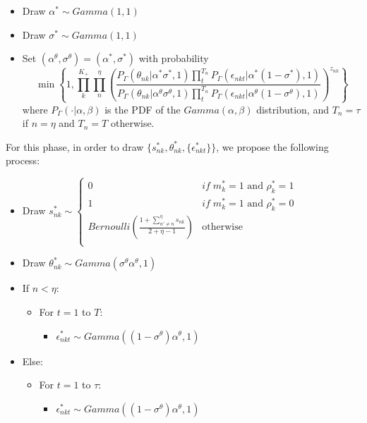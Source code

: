 \documentclass[12pt]{article}
\begin{document}
\begin{itemize}
	\item Draw $\alpha^* \sim Gamma(1,1)$
	\item Draw $\sigma^* \sim Gamma(1,1)$
	\item Set $(\alpha^\theta,\sigma^\theta)=(\alpha^*,\sigma^*)$ with probability $$\min\left\{ 1 , \prod_{k}^{K_+} \prod_{n}^{\eta} \left( \frac{ 
		P_\Gamma(\theta_{nk}|\alpha^* \sigma^*,1) \prod_{t}^{T_n} P_\Gamma(\epsilon_{nkt}|\alpha^* (1-\sigma^*),1) 
	}{
		P_\Gamma(\theta_{nk}|\alpha^\theta \sigma^\theta,1) \prod_{t}^{T_n} P_\Gamma(\epsilon_{nkt}|\alpha^\theta (1-\sigma^\theta),1) 
	} \right)^{z_{nk}} \right\}$$
	where $P_\Gamma(\cdot|\alpha,\beta)$ is the PDF of the $Gamma(\alpha,\beta)$ distribution, and $T_n=\tau$ if $n=\eta$ and $T_n=T$ otherwise.
\end{itemize}


For this phase, in order to draw $\{s^*_{nk},\theta^*_{nk},\{\epsilon^*_{nkt}\}\}$, we propose the following process:

\begin{itemize}
	\item Draw $s^*_{n k} \sim \left\{ \begin{array}{cl}
	0 & if \; m^*_k=1 \text{ and } \rho^*_k=1 \\
	1 & if \; m^*_k=1 \text{ and } \rho^*_k=0 \\
	Bernoulli(\frac{1 + \sum_{n'\neq n}^{\eta} s_{nk}}{2+\eta-1}) & \text{otherwise}\\
	\end{array}\right.$
	\item Draw $\theta^*_{n k} \sim Gamma(\sigma^\theta \alpha^\theta,1)$
	\item If $n<\eta$:
	\begin{itemize}
		\item For $t=1$ to $T$:
		\begin{itemize}
			\item $\epsilon^*_{n k t} \sim Gamma((1-\sigma^\theta) \alpha^\theta,1)$
		\end{itemize} 
	\end{itemize}
	\item Else:
	\begin{itemize}
		\item For $t=1$ to $\tau$:
		\begin{itemize}
			\item $\epsilon^*_{n k t} \sim Gamma((1-\sigma^\theta) \alpha^\theta,1)$
		\end{itemize} 
	\end{itemize}
	
\end{itemize}

{}

\end{document}
